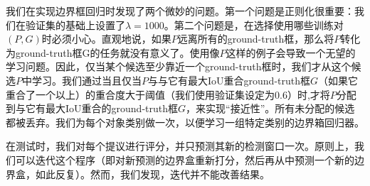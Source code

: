 \documentclass[../main.tex]{subfile}
\begin{document}
我们在实现边界框回归时发现了两个微妙的问题。第一个问题是正则化很重要：我们在验证集的基础上设置了$\lambda = 1000$。第二个问题是，在选择使用哪些训练对$\left( P, G \right)$时必须小心。直观地说，如果$P$远离所有的ground-truth框，那么将$P$转化为ground-truth框G的任务就没有意义了。使用像$P$这样的例子会导致一个无望的学习问题。因此，仅当某个候选至少靠近一个ground-truth框时，我们才从这个候选$P$中学习。我们通过当且仅当$P$与与它有最大IoU重合ground-truth框$G$（如果它重合了一个以上）的重合度大于阈值（我们使用验证集设定为0.6）时,才将$P$分配到与它有最大IoU重合的ground-truth框$G$，来实现“接近性”。所有未分配的候选都被丢弃。我们为每个对象类别做一次，以便学习一组特定类别的边界箱回归器。

在测试时，我们对每个提议进行评分，并只预测其新的检测窗口一次。原则上，我们可以迭代这个程序（即对新预测的边界盒重新打分，然后再从中预测一个新的边界盒，如此反复）。然而，我们发现，迭代并不能改善结果。
\end{document}
